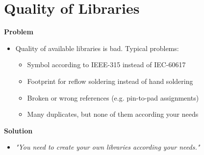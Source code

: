 \section{Quality of Libraries}

\begin{frame}{\secname}
  \textbf{Problem}
  \begin{itemize}
    \item Quality of available libraries is bad. Typical problems:
      \begin{itemize}
        \item Symbol according to IEEE-315 instead of IEC-60617
        \item Footprint for reflow soldering instead of hand soldering
        \item Broken or wrong references (e.g. pin-to-pad assignments)
        \item Many duplicates, but none of them according your needs
      \end{itemize}
  \end{itemize}

  \pause

  \textbf{Solution}
  \begin{itemize}
    \item \textit{"You need to create your own libraries according your needs."}
  \end{itemize}

  \pause

\end{frame}
